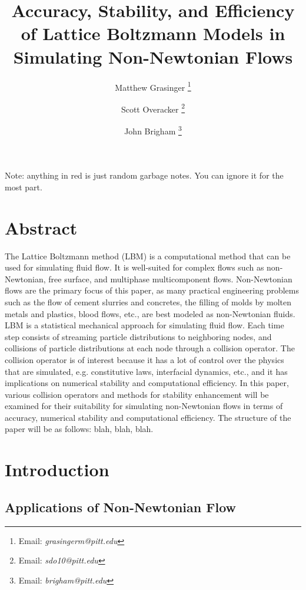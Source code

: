 \documentclass{article}
\title{Accuracy, Stability, and Efficiency of Lattice Boltzmann Models in Simulating Non-Newtonian Flows}
\author{{Matthew Grasinger}
\thanks{Email: \textit{grasingerm@pitt.edu}}}
\author{{Scott Overacker}
\thanks{Email: \textit{sdo10@pitt.edu}}}
\author{John Brigham
\thanks{Email: \textit{brigham@pitt.edu}}}
\affil{Civil and Environmental Engineering Department, University of Pittsburgh}
\begin{document}
\maketitle
\newpage
\tableofcontents
\newpage
{}

Note: anything in {\color{red}red} is just random garbage notes.
You can ignore it for the most part.

\section*{Abstract}

The Lattice Boltzmann method (LBM) is a computational method that can be used for simulating fluid flow.
It is well-suited for complex flows such as non-Newtonian, free surface, and multiphase multicomponent flows.
Non-Newtonian flows are the primary focus of this paper, as many practical engineering problems such as the flow of cement slurries and concretes, the filling of molds by molten metals and plastics, blood flows, etc., are best modeled as non-Newtonian fluids.
LBM is a statistical mechanical approach for simulating fluid flow.
Each time step consists of streaming particle distributions to neighboring nodes, and collisions of particle distributions at each node through a collision operator.
The collision operator is of interest because it has a lot of control over the physics that are simulated, e.g. constitutive laws, interfacial dynamics, etc., and it has implications on numerical stability and computational efficiency.
In this paper, various collision operators and methods for stability enhancement will be examined for their suitability for simulating non-Newtonian flows in terms of accuracy, numerical stability and computational efficiency.
The structure of the paper will be as follows: blah, blah, blah.

\section{Introduction} %

\subsection{Applications of Non-Newtonian Flow}
\end{document}
